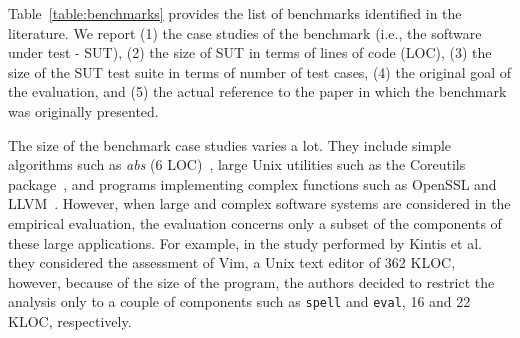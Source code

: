 Table~\ref{table:benchmarks} provides the list of benchmarks identified in the literature. We report (1) the case studies of the benchmark (i.e., the software under test - SUT), (2) the size of SUT in terms of lines of code (LOC), (3) the size of the SUT test suite in terms of number of test cases, (4) the original goal of the evaluation, and (5) the actual reference to the paper in which the benchmark was originally presented. 




The size of the benchmark case studies varies a lot. They include simple algorithms such as \textit{abs} (6 LOC)~\cite{tokumoto2016muvm}, large Unix utilities such as the Coreutils package~\cite{hariri2019comparing,papadakis2018mutation,chekam2017empirical}, and programs implementing complex functions such as OpenSSL and LLVM~\cite{denisov2018mull}.
However, when large and complex software systems are considered in the empirical evaluation, the evaluation concerns only a subset of the components of these large applications.
For example, in the study performed by Kintis et al.~\cite{kintis2017detecting} they considered the assessment of Vim, a Unix text editor of 362 KLOC, however, because of the size of the program, the authors decided to restrict the analysis only to a couple of components such as \texttt{spell} and \texttt{eval}, 16 and 22 KLOC, respectively. 


